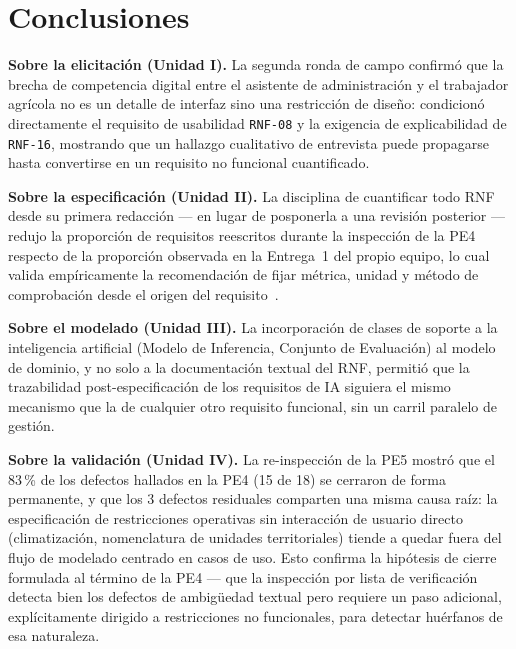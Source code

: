 \documentclass[11pt,a4paper]{article}
\newcommand{\id}[1]{\texttt{#1}}
\begin{document}
\begin{center}
\end{center}

\section{Conclusiones}

\textbf{Sobre la elicitación (Unidad I).} La segunda ronda de campo confirmó que la brecha de
competencia digital entre el asistente de administración y el trabajador agrícola no es un detalle
de interfaz sino una restricción de diseño: condicionó directamente el requisito de usabilidad
\id{RNF-08} y la exigencia de explicabilidad de \id{RNF-16}, mostrando que un hallazgo cualitativo
de entrevista puede propagarse hasta convertirse en un requisito no funcional cuantificado.

\textbf{Sobre la especificación (Unidad II).} La disciplina de cuantificar todo RNF desde su
primera redacción --- en lugar de posponerla a una revisión posterior --- redujo la proporción de
requisitos reescritos durante la inspección de la PE4 respecto de la proporción observada en la
Entrega~1 del propio equipo, lo cual valida empíricamente la recomendación de fijar métrica, unidad
y método de comprobación desde el origen del requisito~\cite{habibullah2023}.

\textbf{Sobre el modelado (Unidad III).} La incorporación de clases de soporte a la inteligencia
artificial (Modelo de Inferencia, Conjunto de Evaluación) al modelo de dominio, y no solo a la
documentación textual del RNF, permitió que la trazabilidad post-especificación de los requisitos
de IA siguiera el mismo mecanismo que la de cualquier otro requisito funcional, sin un carril
paralelo de gestión.

\textbf{Sobre la validación (Unidad IV).} La re-inspección de la PE5 mostró que el 83\,\% de los
defectos hallados en la PE4 (15 de 18) se cerraron de forma permanente, y que los 3 defectos
residuales comparten una misma causa raíz: la especificación de restricciones operativas sin
interacción de usuario directo (climatización, nomenclatura de unidades territoriales) tiende a
quedar fuera del flujo de modelado centrado en casos de uso. Esto confirma la hipótesis de cierre
formulada al término de la PE4 --- que la inspección por lista de verificación detecta bien los
defectos de ambigüedad textual pero requiere un paso adicional, explícitamente dirigido a
restricciones no funcionales, para detectar huérfanos de esa naturaleza.
\end{document}
